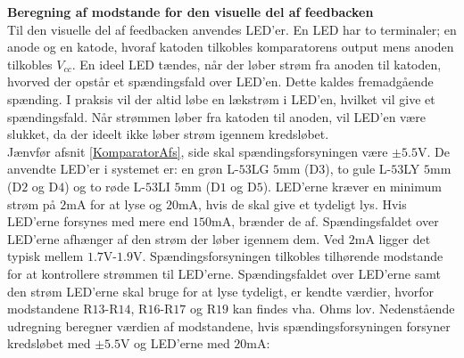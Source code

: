 \noindent\textbf{Beregning af modstande for den visuelle del af feedbacken} \\
Til den visuelle del af feedbacken anvendes LED'er. En LED har to terminaler; en anode og en katode, hvoraf katoden tilkobles komparatorens output mens anoden tilkobles $V_{cc}$. En ideel LED tændes, når der løber strøm fra anoden til katoden, hvorved der opstår et spændingsfald over LED'en. Dette kaldes fremadgående spænding. I praksis vil der altid løbe en lækstrøm i LED'en, hvilket vil give et spændingsfald. Når strømmen løber fra katoden til anoden, vil LED'en være slukket, da der ideelt ikke løber strøm igennem kredsløbet. \cite{Sedra2010} \\
Jænvfør afsnit \ref{KomparatorAfs}, side \pageref{KomparatorAfs} skal spændingsforsyningen være $\pm5.5$V. De anvendte LED'er i systemet er: en grøn L-$53$LG $5$mm (D$3$), to gule L-$53$LY $5$mm (D$2$ og D$4$) og to røde L-$53$LI $5$mm (D$1$ og D$5$). LED'erne kræver en minimum strøm på $2$mA for at lyse og $20$mA, hvis de skal give et tydeligt lys. Hvis LED'erne forsynes med mere end $150$mA, brænder de af. Spændingsfaldet over LED'erne afhænger af den strøm der løber igennem dem. Ved $2$mA ligger det typisk mellem $1.7$V-$1.9$V. 
Spændingsforsyningen tilkobles tilhørende modstande for at kontrollere strømmen til LED'erne. \cite{kingbright} Spændingsfaldet over LED'erne samt den strøm LED'erne skal bruge for at lyse tydeligt, er kendte værdier, hvorfor modstandene R$13$-R$14$, R$16$-R$17$ og R$19$ kan findes vha. Ohms lov. Nedenstående udregning beregner værdien af modstandene, hvis spændingsforsyningen forsyner kredsløbet med $\pm5.5$V og LED'erne med $20$mA:

